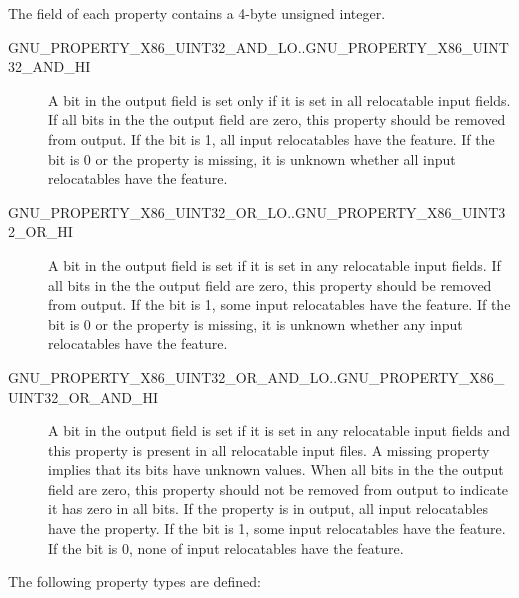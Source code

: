 The  field of each property contains a 4-byte unsigned
integer.

\begin{description}
 \item[GNU_PROPERTY_X86_UINT32_AND_LO..GNU_PROPERTY_X86_UINT32_AND_HI]
   A bit in the output  field is set only if it is set in
   all relocatable input  fields.  If all bits in the
   the output  field are zero, this property should be
   removed from output.  If the bit is 1, all input relocatables have
   the feature.  If the bit is 0 or the property is missing, it is
   unknown whether all input relocatables have the feature.
 \item[GNU_PROPERTY_X86_UINT32_OR_LO..GNU_PROPERTY_X86_UINT32_OR_HI]
   A bit in the output  field is set if it is set in any
   relocatable input  fields.  If all bits in the
   the output  field are zero, this property should be
   removed from output.  If the bit is 1, some input relocatables have
   the feature.  If the bit is 0 or the property is missing, it is
   unknown whether any input relocatables have the feature.
 \item[GNU_PROPERTY_X86_UINT32_OR_AND_LO..GNU_PROPERTY_X86_UINT32_OR_AND_HI]
   A bit in the output  field is set if it is set in any
   relocatable input  fields and this property is present
   in all relocatable input files.  A missing property implies that its
   bits have unknown values.  When all bits in the the output
    field are zero, this property should not be removed
   from output to indicate it has zero in all bits.  If the property
   is in output, all input relocatables have the property.  If the bit
   is 1, some input relocatables have the feature.  If the bit is 0,
   none of input relocatables have the feature.
\end{description}

The following property types are defined:

